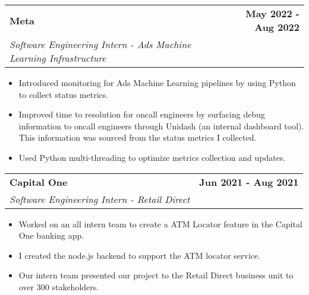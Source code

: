 \documentclass[10pt]{extreport}
\makeatletter
\newcommand{\resumeSubheading}[4]{
  \vspace{-1pt}
    \begin{tabular*}{1.0\textwidth}{l@{\extracolsep{\fill}}r}
      \textbf{#1} & \textbf{#2}  \vspace{1mm} \\
      {#3} & \textbf{#4} \\
    \end{tabular*}\vspace{-3pt}
}
\makeatother
\begin{document}
\resumeSubheading{Meta}{May 2022 - Aug 2022}
    {\textit{Software Engineering Intern - Ads Machine Learning Infrastructure}}{}
    \vspace{-2mm}
    \begin{itemize}
     \item[\textperiodcentered] Introduced monitoring for Ads Machine Learning pipelines by using Python to collect status metrics.

     \vspace{-2mm}
     \item[\textperiodcentered] Improved time to resolution for oncall engineers by surfacing debug information to oncall engineers through Unidash (an internal dashboard tool). This information was sourced from the status metrics I collected.

     \vspace{-2mm}
     \item[\textperiodcentered] Used Python multi-threading to optimize metrics collection and updates.
    \end{itemize}
    
    \resumeSubheading{Capital One}{Jun 2021 - Aug 2021}
    {\textit{Software Engineering Intern - Retail Direct}}{}
    \vspace{-2mm}
    \begin{itemize}
    \item[\textperiodcentered] Worked on an all intern team to create a ATM Locator feature in the Capital One banking app.
            \vspace{-2mm}

        \item[\textperiodcentered] I created the node.js backend to support the ATM locator service.
                \vspace{-2mm}

        \item[\textperiodcentered] Our intern team presented our project to the Retail Direct business unit to over 300 stakeholders.
    \end{itemize}
    
\end{document}
